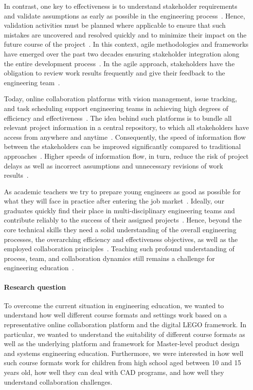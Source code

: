\documentclass{PDS}
\begin{document}
In contrast, one key to effectiveness is to understand stakeholder requirements and validate assumptions as early as possible in the engineering process~\cite{TODO}.
Hence, validation activities must be planned where applicable to ensure that such mistakes are uncovered and resolved quickly and to minimize their impact on the future course of the project~\cite{TODO}.
In this context, agile methodologies and frameworks have emerged over the past two decades ensuring stakeholder integration along the entire development process~\cite{TODO}.
In the agile approach, stakeholders have the obligation to review work results frequently and give their feedback to the engineering team~\cite{TODO}.

Today, online collaboration platforms with vision management, issue tracking, and task scheduling support engineering teams in achieving high degrees of efficiency and effectiveness~\cite{TODO}.
The idea behind such platforms is to bundle all relevant project information in a central repository, to which all stakeholders have access from anywhere and anytime~\cite{TODO}.
Consequently, the speed of information flow between the stakeholders can be improved significantly compared to traditional approaches~\cite{TODO}.
Higher speeds of information flow, in turn, reduce the risk of project delays as well as incorrect assumptions and unnecessary revisions of work results~\cite{TODO}.

As academic teachers we try to prepare young engineers as good as possible for what they will face in practice after entering the job market~\cite{TODO}.
Ideally, our graduates quickly find their place in multi-disciplinary engineering teams and contribute reliably to the success of their assigned projects~\cite{TODO}.
Hence, beyond the core technical skills they need a solid understanding of the overall engineering processes, the overarching efficiency and effectiveness objectives, as well as the employed collaboration principles~\cite{TODO}.
Teaching such profound understanding of process, team, and collaboration dynamics still remains a challenge for engineering education~\cite{TODO}.

\paragraph{Research question}

To overcome the current situation in engineering education, we wanted to understand how well different course formats and settings work based on a representative online collaboration platform and the digital LEGO framework.
In particular, we wanted to understand the suitability of different course formats as well as the underlying platform and framework for Master-level product design and systems engineering education.
Furthermore, we were interested in how well such course formats work for children from high school aged between 10 and 15 years old, how well they can deal with CAD programs, and how well they understand collaboration challenges.
\end{document}
